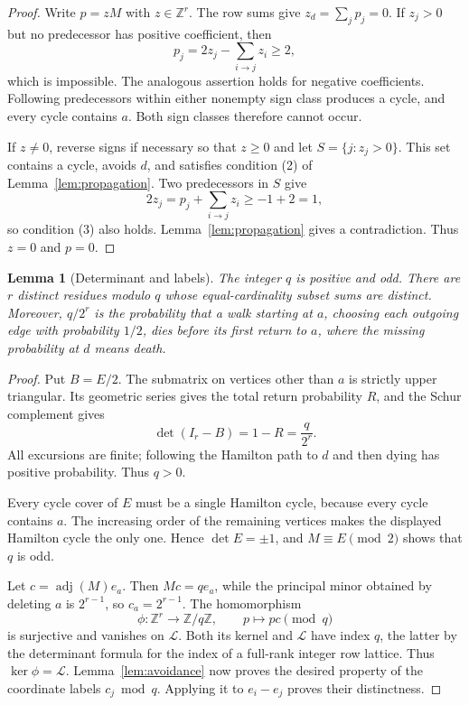 \documentclass[reqno]{amsart}
\newtheorem{lemma}[theorem]{Lemma}
\theoremstyle{remark}
\newcommand{\Z}{\mathbb Z}
\numberwithin{equation}{section}
\begin{document}
\begin{proof}
Write $p=zM$ with $z\in\Z^r$. The row sums give $z_d=\sum_jp_j=0$.
If $z_j>0$ but no predecessor has positive coefficient, then
\[
 p_j=2z_j-\sum_{i\to j}z_i\geq2,
\]
which is impossible. The analogous assertion holds for negative coefficients.
Following predecessors within either nonempty sign class produces a cycle,
and every cycle contains $a$. Both sign classes therefore cannot occur.

If $z\ne0$, reverse signs if necessary so that $z\geq0$ and let
$S=\{j:z_j>0\}$. This set contains a cycle, avoids $d$, and satisfies
condition (2) of Lemma~\ref{lem:propagation}. Two predecessors in $S$ give
\[
 2z_j=p_j+\sum_{i\to j}z_i\geq-1+2=1,
\]
so condition (3) also holds. Lemma~\ref{lem:propagation} gives a contradiction.
Thus $z=0$ and $p=0$.
\end{proof}

\begin{lemma}[Determinant and labels]\label{lem:labels}
The integer $q$ is positive and odd. There are $r$ distinct residues modulo
$q$ whose equal-cardinality subset sums are distinct. Moreover, $q/2^r$ is
the probability that a walk starting at $a$, choosing each outgoing edge
with probability $1/2$, dies before its first return to $a$, where the
missing probability at $d$ means death.
\end{lemma}

\begin{proof}
Put $B=E/2$. The submatrix on vertices other than $a$ is strictly upper
triangular. Its geometric series gives the total return probability $R$,
and the Schur complement gives
\[
 \det(I_r-B)=1-R=\frac{q}{2^r}.
\]
All excursions are finite; following the Hamilton path to $d$ and then
dying has positive probability. Thus $q>0$.

Every cycle cover of $E$ must be a single Hamilton cycle, because every
cycle contains $a$. The increasing order of the remaining vertices makes
the displayed Hamilton cycle the only one. Hence $\det E=\pm1$, and
$M\equiv E\pmod2$ shows that $q$ is odd.

Let $c=\operatorname{adj}(M)e_a$. Then $Mc=qe_a$, while the principal minor
obtained by deleting $a$ is $2^{r-1}$, so $c_a=2^{r-1}$.
The homomorphism
\[
 \phi:\Z^r\longrightarrow\Z/q\Z,\qquad p\longmapsto pc\pmod q
\]
is surjective and vanishes on $\mathcal L$. Both its kernel and
$\mathcal L$ have index $q$, the latter by the determinant formula for the
index of a full-rank integer row lattice. Thus $\ker\phi=\mathcal L$.
Lemma~\ref{lem:avoidance} now proves the desired property of the coordinate
labels $c_j\bmod q$. Applying it to $e_i-e_j$ proves their distinctness.
\end{proof}
\end{document}
